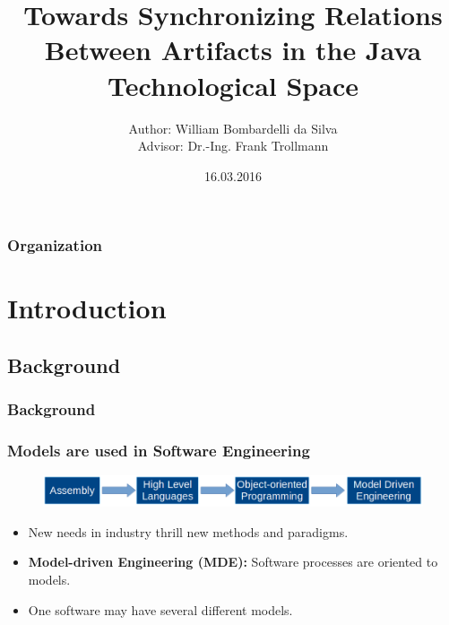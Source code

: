\documentclass{beamer}
\title[Synchronizing Relations in Java]{Towards Synchronizing Relations Between Artifacts in the Java Technological Space} %
\author[William]{
\vskip 12pt
Author: William Bombardelli da Silva\\
Advisor: Dr.-Ing. Frank Trollmann} %
\institute[TU Berlin] %
{
\vskip 12pt
Technische Universität Berlin \\ %
Fakultät IV Elektrotechnik und Informatik \\
Bachelorstudiengang Informatik \\
\medskip
\textit{wbombardellis@win.tu-berlin.de} %
}
\date{16.03.2016} %
\begin{document}
\begin{frame}
	\titlepage %
\end{frame}

\begin{frame}
	\frametitle{Organization} %
	\tableofcontents %
\end{frame}


\section{Introduction} %
\subsection{Background}
\begin{frame}
	\frametitle{Background}
\end{frame}

\begin{frame}
	\frametitle{Models are used in Software Engineering}
	\begin{figure}[H]
		\includegraphics[width=\textwidth]{LanguagesHystoryDiagram}
	\end{figure}
	\pause
	\begin{itemize}
		\item New needs in industry thrill new methods and paradigms.
		\item \textbf{Model-driven Engineering (MDE):} Software processes are oriented to models.
		\item One software may have several different models.
	\end{itemize}
\end{frame}
\end{document}

